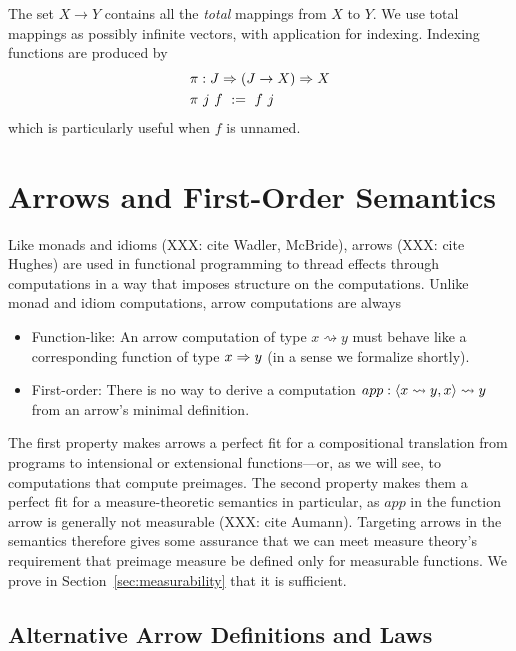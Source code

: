 \documentclass[preprint]{sigplanconf}
\newcommand{\arrow}{\rightsquigarrow}
\begin{document}
The set $X \to Y$ contains all the \emph{total} mappings from $X$ to $Y$.
We use total mappings as possibly infinite vectors, with application for indexing.
Indexing functions are produced by
\begin{equation}
\begin{aligned}
	&\pi : J \Rightarrow (J \to X) \Rightarrow X \\
	&\pi~j~f \ := \ f~j
\end{aligned}
\end{equation}
which is particularly useful when $f$ is unnamed.


\section{Arrows and First-Order Semantics}

Like monads and idioms (XXX: cite Wadler, McBride), arrows (XXX: cite Hughes) are used in functional programming to thread effects through computations in a way that imposes structure on the computations.
Unlike monad and idiom computations, arrow computations are always
\begin{itemize}
	\item Function-like: An arrow computation of type $x \arrow y$ must behave like a corresponding function of type $x \Rightarrow y$ (in a sense we formalize shortly).
	\item First-order: There is no way to derive a computation $app : \pair{x \arrow y, x} \arrow y$ from an arrow's minimal definition.
\end{itemize}
The first property makes arrows a perfect fit for a compositional translation from programs to intensional or extensional functions---or, as we will see, to computations that compute preimages.
The second property makes them a perfect fit for a measure-theoretic semantics in particular, as $app$ in the function arrow is generally not measurable (XXX: cite Aumann).
Targeting arrows in the semantics therefore gives some assurance that we can meet measure theory's requirement that preimage measure be defined only for measurable functions.
We prove in Section~\ref{sec:measurability} that it is sufficient.

\subsection{Alternative Arrow Definitions and Laws}
\label{sec:arrow-definitions}
\end{document}
